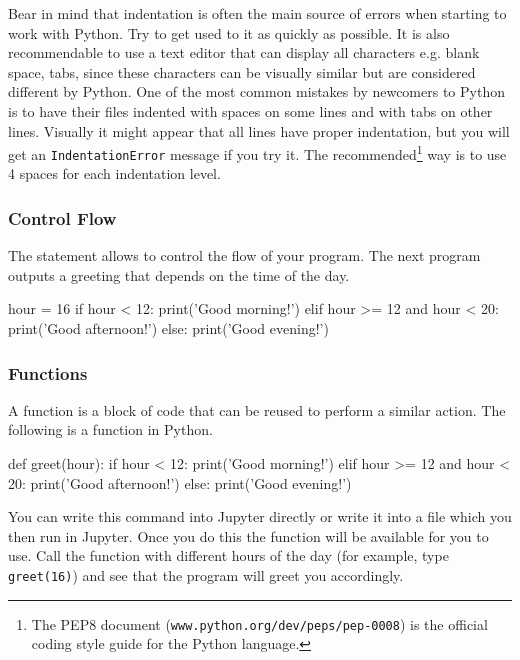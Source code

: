 \noindent Bear in mind that indentation is often the main source of errors when starting to work with Python. Try to get used to it as quickly as possible. It is also recommendable to use a text editor that can display all characters e.g. blank space, tabs, since these characters can be visually similar but are considered different by Python. One of the most common mistakes by newcomers to Python is to have their files indented with spaces on some lines and with tabs on other lines. Visually it might appear that all lines have proper indentation, but you will get an \texttt{IndentationError} message if you try it. The recommended\footnote{The PEP8 document (\texttt{www.python.org/dev/peps/pep-0008}) is the official coding style guide for the Python language.} way is to use 4 spaces for each indentation level.

\subsubsection{Control Flow}

The  statement allows to control the flow of your program. The next program outputs a greeting that depends on the time of the day.

\begin{python}
hour = 16
if hour < 12:
    print('Good morning!')
elif hour >= 12 and hour < 20:
    print('Good afternoon!')
else:
    print('Good evening!')
\end{python}

\subsubsection{Functions}

A function is a block of code that can be reused to perform a similar action.
The following is a function in Python. 

\begin{python}
def greet(hour):
    if hour < 12:
        print('Good morning!')
    elif hour >= 12 and hour < 20:
        print('Good afternoon!')
    else:
        print('Good evening!')
\end{python}

You can write this command into Jupyter directly or write it into a file which you then run in Jupyter. Once you do this the function will be available for you to use. Call the function  with different hours of the day (for example, type \texttt{greet(16)}) and see that the program will greet you accordingly.


